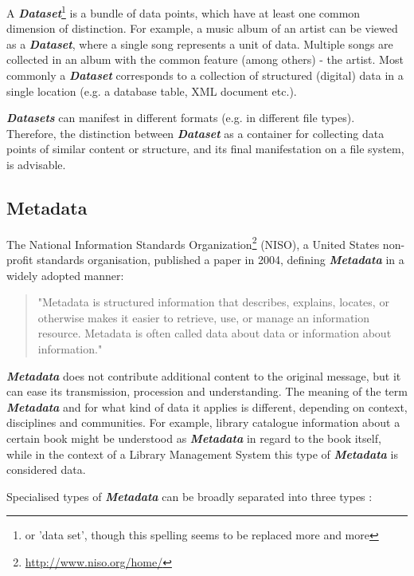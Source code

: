 \documentclass[a4paper,english,twoside,BCOR1.5cm,headsepline,DIV12,appendixprefix,final,12pt]{scrbook}
\newcommand{\important}[1]{\textbf{\textit{#1}}}
\newcommand\footnoteurl[1]{\footnote{\scriptsize\url{#1}}}
\begin{document}
A \important{Dataset}\footnote{or 'data set', though this spelling seems to be replaced more and more} is a bundle of data points, which have at least one common dimension of distinction. For example, a music album of an artist can be viewed as a \important{Dataset}, where a single song represents a unit of data. Multiple songs are collected in an album with the common feature (among others) - the artist. Most commonly a \important{Dataset} corresponds to a collection of structured (digital) data in a single location (e.g. a database table, XML document etc.).

\important{Datasets} can manifest in different formats (e.g. in different file types). Therefore, the distinction between \important{Dataset} as a container for collecting data points of similar content or structure, and its final manifestation on a file system, is advisable.


\subsection{Metadata}
\label{sec:metadata}

The National Information Standards Organization\footnoteurl{http://www.niso.org/home/} (NISO), a United States non-profit standards organisation, published a paper in 2004, defining \important{Metadata} in a widely adopted manner:

\begin{quote}
"Metadata is structured information
that describes, explains,
locates, or otherwise makes it
easier to retrieve, use, or manage
an information resource. Metadata
is often called data about data or
information about information." \cite{NISO2004}
\end{quote}

\important{Metadata} does not contribute additional content to the original message, but it can ease its transmission, procession and understanding.
The meaning of the term \important{Metadata} and for what kind of data it applies is different, depending on context, disciplines and communities.
For example, library catalogue information about a certain book might be understood as \important{Metadata} in regard to the book itself, while in the context of a Library Management System this type of \important{Metadata} is considered data.

Specialised types of \important{Metadata} can be broadly separated into three types \cite{NISO2004}:
\end{document}
